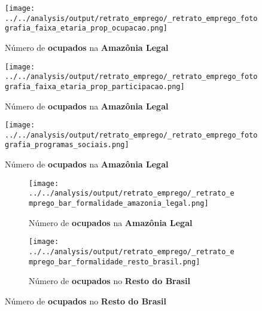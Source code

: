 \documentclass[11pt]{beamer}
\begin{document}
\begin{frame}[label=_retrato_emprego_fotografia_faixa_etaria_prop_ocupacao]{}
\textit{\hyperlink{indice_principal}{}}
\begin{figure}
  \centering
  \texttt{[image: ../../analysis/output/retrato\_emprego/\_retrato\_emprego\_fotografia\_faixa\_etaria\_prop\_ocupacao.png]}
  \label{fig:_retrato_emprego_fotografia_faixa_etaria_prop_ocupacao}
  \caption{{\tiny Número de \textbf{ocupados} na \textbf{Amazônia Legal}}}
\end{figure}
\end{frame}

\begin{frame}[label=_retrato_emprego_fotografia_faixa_etaria_prop_participacao]{}
\textit{\hyperlink{indice_principal}{}}
\begin{figure}
  \centering
  \texttt{[image: ../../analysis/output/retrato\_emprego/\_retrato\_emprego\_fotografia\_faixa\_etaria\_prop\_participacao.png]}
  \label{fig:_retrato_emprego_fotografia_faixa_etaria_prop_participacao}
  \caption{{\tiny Número de \textbf{ocupados} na \textbf{Amazônia Legal}}}
\end{figure}
\end{frame}

\begin{frame}[label=_retrato_emprego_fotografia_programas_sociais]{}
\textit{\hyperlink{indice_principal}{}}
\begin{figure}
  \centering
  \texttt{[image: ../../analysis/output/retrato\_emprego/\_retrato\_emprego\_fotografia\_programas\_sociais.png]}
  \label{fig:_retrato_emprego_fotografia_programas_sociais}
  \caption{{\tiny Número de \textbf{ocupados} na \textbf{Amazônia Legal}}}
\end{figure}
\end{frame}

\begin{frame}[label=_retrato_emprego_bar_formalidade]{}
\textit{\hyperlink{indice_principal}{}}
\begin{figure}
\centering
\begin{subfigure}{.5\textwidth}
  \centering
  \texttt{[image: ../../analysis/output/retrato\_emprego/\_retrato\_emprego\_bar\_formalidade\_amazonia\_legal.png]}
  \label{fig:_retrato_emprego_bar_formalidade_amazonia_legal}
  \caption{{\tiny Número de \textbf{ocupados} na \textbf{Amazônia Legal}}}
\end{subfigure}%
\begin{subfigure}{.5\textwidth}
  \centering
  \texttt{[image: ../../analysis/output/retrato\_emprego/\_retrato\_emprego\_bar\_formalidade\_resto\_brasil.png]}
  \label{fig:_retrato_emprego_bar_formalidade_resto_brasil}
   \caption{{\tiny Número de \textbf{ocupados} no \textbf{Resto do Brasil}}}
\end{subfigure}
\end{figure}
\end{frame}
\end{document}
